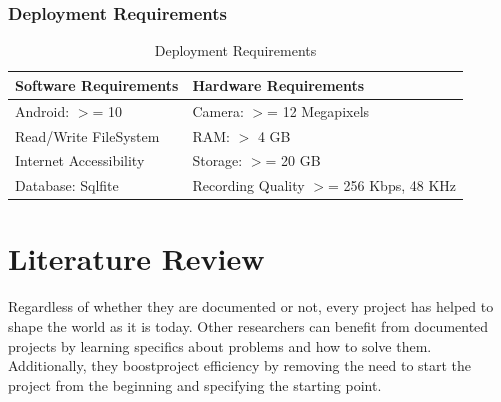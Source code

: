 \subsection{Deployment Requirements}
\begin{table}[ht]
    \centering
    \caption{Deployment Requirements}
    \begin{tabular}{|l|l|}
        \hline
        \textbf{Software Requirements} & \textbf{Hardware Requirements}\\ \hline
        Android: \(>\)= 10 & Camera: \(>\)= 12 Megapixels\\ \hline
        Read/Write FileSystem & RAM: \(>\) 4 GB\\ \hline
        Internet Accessibility & Storage: \(>\)= 20 GB\\ \hline
        Database: Sqlfite & Recording Quality \(>\)= 256 Kbps, 48 KHz\\ \hline
    \end{tabular}
\end{table}


\chapter{Literature Review}

Regardless of whether they are documented or not, every project has helped to shape the world as it is today.
Other researchers can benefit from documented projects by learning specifics about problems and how to solve
them. Additionally, they boostproject efficiency by removing the need to start the project from the beginning 
and specifying the starting point.

